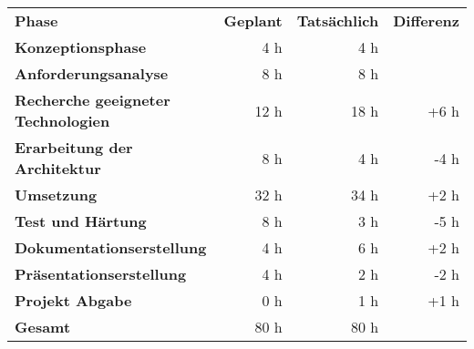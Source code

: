 \begin{tabular}{lrrr}
\rowcolor{heading}\textbf{Phase} & \textbf{Geplant} & \textbf{Tatsächlich} & \textbf{Differenz} \\
\textbf{Konzeptionsphase} & 4 h  & 4 h  &  \\
\rowcolor{odd}\textbf{Anforderungsanalyse} & 8 h   & 8 h  &  \\
\textbf{Recherche geeigneter Technologien} & 12 h  & 18 h  & +6 h \\
\rowcolor{odd}\textbf{Erarbeitung der Architektur} & 8 h   & 4 h   & -4 h \\
\textbf{Umsetzung} & 32 h   & 34 h   & +2 h \\
\rowcolor{odd}\textbf{Test und Härtung} & 8 h   & 3 h  & -5 h \\
\textbf{Dokumentationserstellung} & 4 h   & 6 h   & +2 h \\
\rowcolor{odd}\textbf{Präsentationserstellung} & 4 h   & 2 h  & -2 h \\
\textbf{Projekt Abgabe} & 0 h   & 1 h   & +1 h \\
\hline
\hline
\rowcolor{odd}\textbf{Gesamt} & 80 h  & 80 h  &  \\
\end{tabular}
